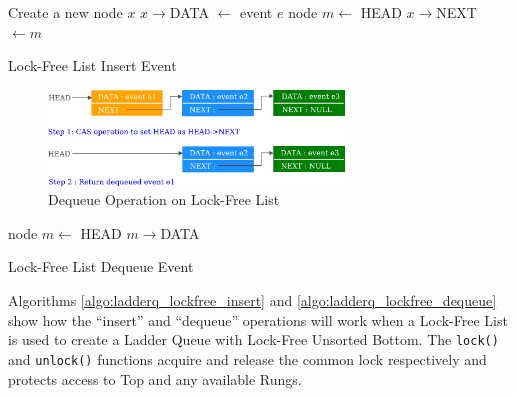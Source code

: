 \documentclass[11pt]{book}
\begin{document}
\begin{algorithm}
\DontPrintSemicolon
{}

    Create a new node $x$\;
    $x\rightarrow$DATA $\gets$ event $e$\;
    \;
    node $m \gets$ HEAD\;
    $x\rightarrow$NEXT $\gets m$\;
    \;
\caption{Lock-Free List Insert Event}\label{algo:lockfree_insert}
\end{algorithm}

\begin{figure}
    \centering
    \includegraphics[width=0.7\textwidth]{figures/dequeue_lockfree.pdf}
    \caption{Dequeue Operation on Lock-Free List}\label{fig:lockfree_dequeue}
\end{figure}

\begin{algorithm}
\DontPrintSemicolon
{}

    node $m \gets$ HEAD\;
    \;
    \Return $m\rightarrow$DATA\;
    \;
\caption{Lock-Free List Dequeue Event}\label{algo:lockfree_dequeue}
\end{algorithm}

Algorithms \ref{algo:ladderq_lockfree_insert} and \ref{algo:ladderq_lockfree_dequeue} show how the ``insert''
and ``dequeue'' operations will work when a Lock-Free List is used to create a Ladder Queue with Lock-Free
Unsorted Bottom.  The \texttt{lock()} and \texttt{unlock()} functions acquire and release the common lock
respectively and protects access to Top and any available Rungs.
\end{document}
